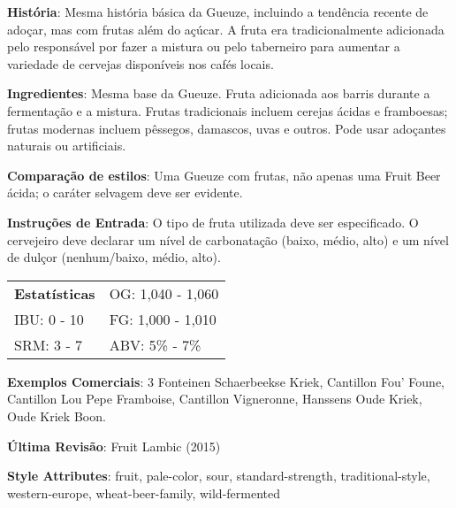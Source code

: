 \textbf{História}: Mesma história básica da Gueuze, incluindo a tendência recente de adoçar, mas com frutas além do açúcar. A fruta era tradicionalmente adicionada pelo responsável por fazer a mistura ou pelo taberneiro para aumentar a variedade de cervejas disponíveis nos cafés locais.

\textbf{Ingredientes}: Mesma base da Gueuze. Fruta adicionada aos barris durante a fermentação e a mistura. Frutas tradicionais incluem cerejas ácidas e framboesas; frutas modernas incluem pêssegos, damascos, uvas e outros. Pode usar adoçantes naturais ou artificiais.

\textbf{Comparação de estilos}: Uma Gueuze com frutas, não apenas uma Fruit Beer ácida; o caráter selvagem deve ser evidente.

\textbf{Instruções de Entrada}: O tipo de fruta utilizada deve ser especificado. O cervejeiro deve declarar um nível de carbonatação (baixo, médio, alto) e um nível de dulçor (nenhum/baixo, médio, alto).

\begin{tabular}{@{}p{35mm}p{35mm}@{}}
  \textbf{Estatísticas} & OG: 1,040 - 1,060 \\
  IBU: 0 - 10  & FG: 1,000 - 1,010  \\
  SRM: 3 - 7  & ABV: 5\% - 7\%
\end{tabular}

\textbf{Exemplos Comerciais}: 3 Fonteinen Schaerbeekse Kriek, Cantillon Fou’ Foune, Cantillon Lou Pepe Framboise, Cantillon Vigneronne, Hanssens Oude Kriek, Oude Kriek Boon.

\textbf{Última Revisão}: Fruit Lambic (2015)

\textbf{Style Attributes}: fruit, pale-color, sour, standard-strength, traditional-style, western-europe, wheat-beer-family, wild-fermented

